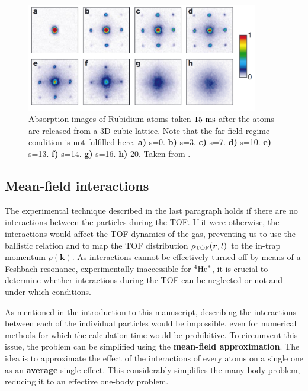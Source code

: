 \begin{figure}
    \centering
    \includegraphics[width=0.9\textwidth]{Fig/Chapter2/mott_greiner.png}
    \caption[Absorption images of Rubidium atoms across the Mott transition]{Absorption images of Rubidium atoms taken $15 \ \rm{ms}$ after the atoms are released from a 3D cubic lattice. Note that the far-field regime condition is not fulfilled here. \textbf{a)} s=0. \textbf{b)} s=3. \textbf{c)} s=7. \textbf{d)} s=10. \textbf{e)} s=13. \textbf{f)} s=14. \textbf{g)} s=16. \textbf{h)} 20. Taken from \cite{greiner2002quantum}.}
    \label{fig:mott_greiner}
\end{figure}


\subsection{Mean-field interactions}

The experimental technique described in the last paragraph holds if there are no interactions between the particles during the TOF. If it were otherwise, the interactions would affect the TOF dynamics of the gas, preventing us to use the ballistic relation and to map the TOF distribution $\rho_{\rm{TOF}}(\bm{r},t)$ to the in-trap momentum $\rho(\bm{k})$. As interactions cannot be effectively turned off by means of a Feshbach resonance, experimentally inaccessible for $^4 \mathrm{He}^*$, it is crucial to determine whether interactions during the TOF can be neglected or not and under which conditions.

As mentioned in the introduction to this manuscript, describing the interactions between each of the individual particles would be impossible, even for numerical methods for which the calculation time would be prohibitive. To circumvent this issue, the problem can be simplified using the \textbf{mean-field approximation}. The idea is to approximate the effect of the interactions of every atoms on a single one as an \textbf{average} single effect. This considerably simplifies the many-body problem, reducing it to an effective one-body problem.

